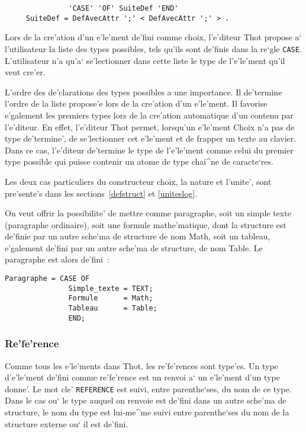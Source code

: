 {\begin{verbatim}
               'CASE' 'OF' SuiteDef 'END'
     SuiteDef = DefAvecAttr ';' < DefAvecAttr ';' > .
\end{verbatim}

Lors de la cre'ation d'un e'le'ment de'fini comme choix, l'e'diteur Thot propose
a` l'utilisateur la liste des types possibles, tels qu'ils sont de'finis dans
la re`gle {\tt CASE}. L'utilisateur n'a qu'a` se'lectionner dans cette liste
le type de l'e'le'ment qu'il veut cre'er.

L'ordre des de'clarations des types possibles a une importance. Il de'termine
l'ordre de la liste propose'e lors de la cre'ation d'un e'le'ment. Il favorise
e'galement les premiers types lors de la cre'ation automatique d'un contenu
par l'e'diteur. En effet, l'e'diteur Thot permet, lorsqu'un e'le'ment Choix
n'a pas de type de'termine', de se'lectionner cet e'le'ment et de frapper un texte
au clavier. Dans ce cas, l'e'diteur de'termine le type de l'e'le'ment comme
celui du premier type possible qui puisse contenir un atome de type chai^ne
de caracte`res.

Les deux cas particuliers du constructeur choix, la nature et l'unite', sont
pre'sente's dans les sections~\ref{defstruct} et \ref{uniteslog}.

\begin{example}
On veut offrir la possibilite' de mettre comme paragraphe, soit un simple texte
(paragraphe ordinaire), soit une formule mathe'matique, dont la structure est
de'finie par un autre sche'ma de structure de nom Math, soit un tableau,
e'galement de'fini par un autre sche'ma de structure, de nom Table. Le paragraphe
est alors de'fini~:

\begin{verbatim}
Paragraphe = CASE OF
               Simple_texte = TEXT;
               Formule      = Math;
               Tableau      = Table;
               END;
\end{verbatim}
\end{example}

\subsubsection{Re'fe'rence}
\label{references}

Comme tous les e'le'ments dans Thot, les re'fe'rences sont type'es.
Un type d'e'le'ment de'fini comme re'fe'rence est un renvoi a` un
e'le'ment d'un type donne'. Le mot cle' {\tt REFERENCE} est suivi,
entre parenthe`ses, du nom de ce type. Dans le cas ou` le type
auquel on renvoie est de'fini dans un autre sche'ma de structure, le nom du
type est lui-me^me suivi entre parenthe`ses du nom de la structure externe
ou` il est de'fini.

}
